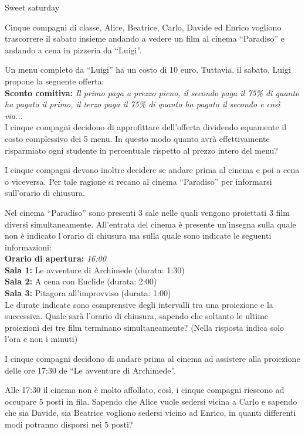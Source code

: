 \documentclass[12pt]{matemaj}
\begin{document}
\titolo Sweet saturday

Cinque compagni di classe, Alice, Beatrice, Carlo, Davide ed Enrico vogliono trascorrere il sabato insieme andando a vedere un film al cinema ``Paradiso'' e andando a cena in pizzeria da ``Luigi''.

\quesito[30;40]
Un menu completo da ``Luigi'' ha un costo di 10 euro. Tuttavia, il sabato, Luigi propone la seguente offerta:\\[6pt]
{\bf Sconto comitiva: }{\it Il primo paga a prezzo pieno, il secondo paga il 75\% di quanto ha pagato il primo, il terzo paga il 75\% di quanto ha pagato il secondo e così via...}\\[6pt]
I cinque compagni decidono di approfittare dell'offerta dividendo equamente il costo complessivo dei 5 menu. In questo modo quanto avrà effettivamente risparmiato ogni studente in percentuale rispetto al prezzo intero del menu?

I cinque compagni devono inoltre decidere se andare prima al cinema e poi a cena o viceversa. Per tale ragione si recano al cinema ``Paradiso'' per informarsi sull'orario di chiusura.

\quesito[1;24]
Nel cinema ``Paradiso'' sono presenti 3 sale nelle quali vengono proiettati 3 film diversi simultaneamente. All'entrata del cinema è presente un'insegna sulla quale non è indicato l'orario di chiusura ma sulla quale sono indicate le seguenti informazioni:\\[6pt]
{\bf Orario di apertura: }{\it 16:00}\\[6pt]
{\bf Sala 1: }{Le avventure di Archimede (durata: 1:30)}\\[6pt]
{\bf Sala 2: }{A cena con Euclide (durata: 2:00)}\\[6pt]
{\bf Sala 3: }{Pitagora all'improvviso (durata: 1:00)}\\[6pt]
Le durate indicate sono comprensive degli intervalli tra una proiezione e la successiva. Quale sarà l'orario di chiusura, sapendo che soltanto le ultime proiezioni dei tre film terminano simultaneamente? (Nella risposta indica solo l'ora e non i minuti)

I cinque compagni decidono di andare prima al cinema ad assistere alla proiezione delle ore 17:30 de ``Le avventure di Archimede''.

\quesito[1;20]
Alle 17:30 il cinema non è molto affollato, così, i cinque compagni riescono ad occupare 5 posti in fila. Sapendo che Alice vuole sedersi vicina a Carlo e sapendo che sia Davide, sia Beatrice vogliono sedersi vicino ad Enrico, in quanti differenti modi potranno disporsi nei 5 posti?
\end{document}
